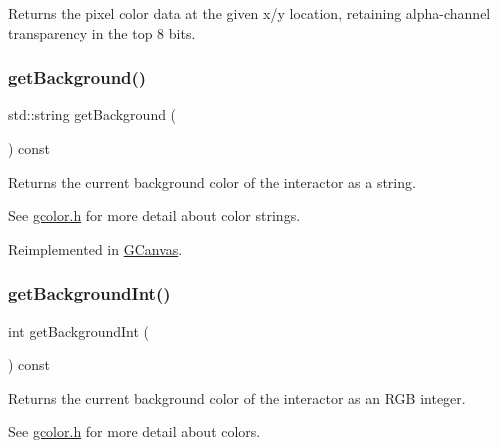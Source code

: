 Returns the pixel color data at the given x/y location, retaining alpha-\/channel transparency in the top 8 bits. 

\mbox{\label{classsgl_1_1GDrawingSurface_a808e22cc1fdfbecf71ed8c64ef4600e0}} 
\subsubsection{\texorpdfstring{get\+Background()}{getBackground()}}
{\footnotesize\ttfamily std\+::string get\+Background (\begin{DoxyParamCaption}{ }\end{DoxyParamCaption}) const\hspace{0.3cm}{\ttfamily [virtual]}}



Returns the current background color of the interactor as a string. 

See \mbox{\hyperlink{gcolor_8h_source}{gcolor.\+h}} for more detail about color strings. 

Reimplemented in \mbox{\hyperlink{classsgl_1_1GCanvas_a4a62c51b7244a7642b88065e3a07ae82}{G\+Canvas}}.

\mbox{\label{classsgl_1_1GDrawingSurface_a9e827257a55cb8cf4d9de2ec6bcfd7a0}} 
\subsubsection{\texorpdfstring{get\+Background\+Int()}{getBackgroundInt()}}
{\footnotesize\ttfamily int get\+Background\+Int (\begin{DoxyParamCaption}{ }\end{DoxyParamCaption}) const\hspace{0.3cm}{\ttfamily [virtual]}}



Returns the current background color of the interactor as an R\+GB integer. 

See \mbox{\hyperlink{gcolor_8h_source}{gcolor.\+h}} for more detail about colors. 

